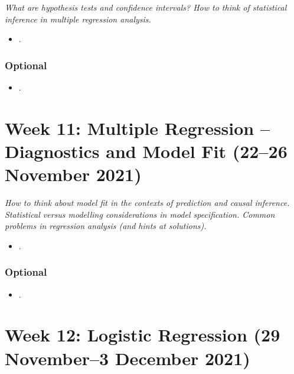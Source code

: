 \documentclass[abstract=on,parskip=full,headings=standardclasses,fontsize=11pt,paper=a4]{scrartcl}
\begin{document}
\textit{What are hypothesis tests and confidence intervals? How to think of statistical inference in multiple regression analysis.}


\begin{itemize}
\item {}.
\end{itemize}


\subsubsection*{Optional}
\begin{itemize}
\item {}.
\end{itemize}



\section{Week 11: Multiple Regression --  Diagnostics and Model Fit (22--26 November 2021)}


\textit{How to think about model fit in the contexts of prediction and causal inference. Statistical versus modelling considerations in model specification. Common problems in regression analysis (and hints at solutions).}

\begin{itemize}
\item {}.
\end{itemize}

\subsubsection*{Optional}
\begin{itemize}
\item {}.
\end{itemize}


\section{Week 12: Logistic Regression  (29 November--3 December 2021)}

\end{document}
